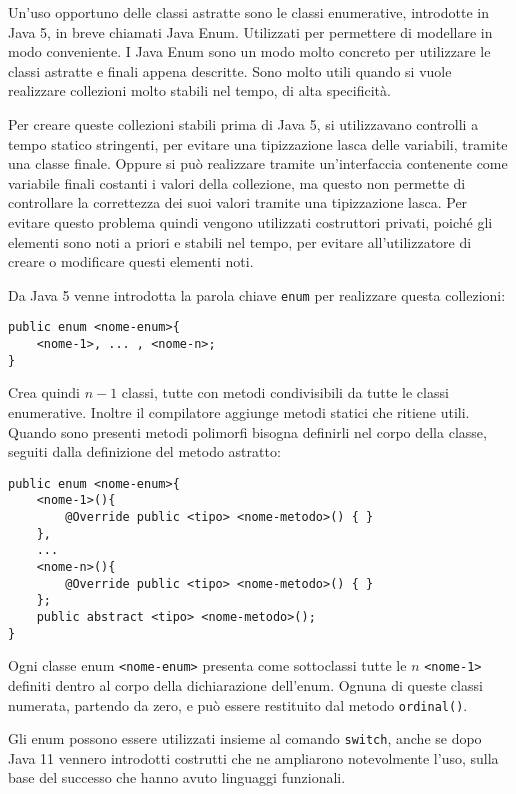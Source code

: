 \documentclass{article}
\numberwithin{equation}{subsection}
\begin{document}
Un'uso opportuno delle classi astratte sono le classi enumerative, introdotte in Java 5, in breve chiamati Java Enum. Utilizzati per permettere di modellare in modo 
conveniente. 
I Java Enum sono un modo molto concreto per utilizzare le classi astratte e finali appena descritte. Sono molto utili quando si vuole realizzare collezioni molto stabili 
nel tempo, di alta specificità. 

Per creare queste collezioni stabili prima di Java 5, si utilizzavano controlli a tempo statico stringenti, per evitare una tipizzazione lasca delle variabili, tramite una 
classe finale. Oppure si può realizzare tramite un'interfaccia contenente come variabile finali costanti i valori della collezione, ma questo non permette di controllare la 
correttezza dei suoi valori tramite una tipizzazione lasca. 
Per evitare questo problema quindi vengono utilizzati costruttori privati, poiché gli elementi sono noti a priori e stabili nel tempo, per evitare all'utilizzatore di creare 
o modificare questi elementi noti. 


Da Java 5 venne introdotta la parola chiave \verb|enum| per realizzare questa collezioni:
\begin{verbatim}
public enum <nome-enum>{
    <nome-1>, ... , <nome-n>;
}
\end{verbatim}

Crea quindi $n-1$ classi, tutte con metodi condivisibili da tutte le classi enumerative. Inoltre il compilatore aggiunge metodi statici che ritiene utili. 
Quando sono presenti metodi polimorfi bisogna definirli nel corpo della classe, seguiti dalla definizione del metodo astratto:
\begin{verbatim}
public enum <nome-enum>{
    <nome-1>(){
        @Override public <tipo> <nome-metodo>() { }
    },
    ...
    <nome-n>(){
        @Override public <tipo> <nome-metodo>() { }
    };
    public abstract <tipo> <nome-metodo>();
}
\end{verbatim}

Ogni classe enum \verb|<nome-enum>| presenta come sottoclassi tutte le $n$ \verb|<nome-1>| definiti dentro al corpo della dichiarazione dell'enum. Ognuna di queste classi 
numerata, partendo da zero, e può essere restituito dal metodo \verb|ordinal()|. 


Gli enum possono essere utilizzati insieme al comando \verb|switch|, anche se dopo Java 11 vennero introdotti costrutti che ne ampliarono notevolmente l'uso, sulla base del 
successo che hanno avuto linguaggi funzionali. 
\end{document}
